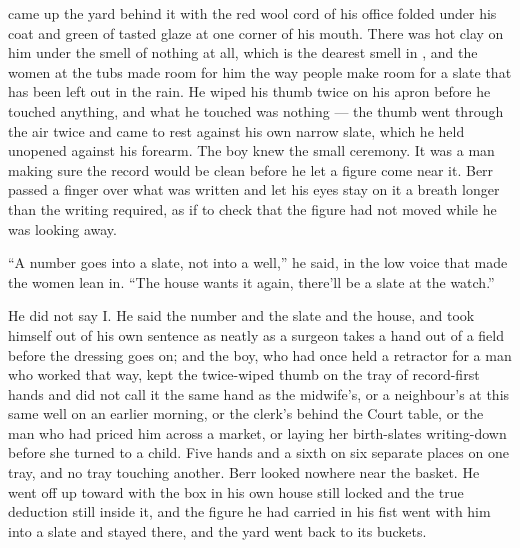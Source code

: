  came up the yard behind it with the red wool cord of his office folded under his coat and green of tasted glaze at one corner of his mouth. There was hot clay on him under the smell of nothing at all, which is the dearest smell in , and the women at the tubs made room for him the way people make room for a slate that has been left out in the rain. He wiped his thumb twice on his apron before he touched anything, and what he touched was nothing --- the thumb went through the air twice and came to rest against his own narrow slate, which he held unopened against his forearm. The boy knew the small ceremony. It was a man making sure the record would be clean before he let a figure come near it. Berr passed a finger over what was written and let his eyes stay on it a breath longer than the writing required, as if to check that the figure had not moved while he was looking away.

“A number goes into a slate, not into a well,” he said, in the low voice that made the women lean in. “The house wants it again, there'll be a slate at the watch.”

He did not say I. He said the number and the slate and the house, and took himself out of his own sentence as neatly as a surgeon takes a hand out of a field before the dressing goes on; and the boy, who had once held a retractor for a man who worked that way, kept the twice-wiped thumb on the tray of record-first hands and did not call it the same hand as the midwife's, or a neighbour's at this same well on an earlier morning, or the clerk's behind the Court table, or the man who had priced him across a market, or  laying her birth-slates writing-down before she turned to a child. Five hands and a sixth on six separate places on one tray, and no tray touching another. Berr looked nowhere near the basket. He went off up toward  with the box in his own house still locked and the true deduction still inside it, and the figure he had carried in his fist went with him into a slate and stayed there, and the yard went back to its buckets.

\scenebreak

